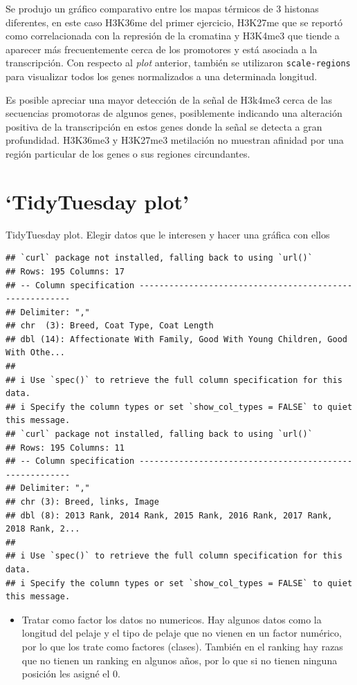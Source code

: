 \documentclass[
]{article}
\newcommand{\passthrough}[1]{#1}
\providecommand{\tightlist}{%
  \setlength{\itemsep}{0pt}\setlength{\parskip}{0pt}}
\begin{document}
Se produjo un gráfico comparativo entre los mapas térmicos de 3 histonas
diferentes, en este caso H3K36me del primer ejercicio, H3K27me que se
reportó como correlacionada con la represión de la cromatina y H3K4me3
que tiende a aparecer más frecuentemente cerca de los promotores y está
asociada a la transcripción. Con respecto al \emph{plot} anterior,
también se utilizaron \passthrough{\lstinline!scale-regions!} para
visualizar todos los genes normalizados a una determinada longitud.

Es posible apreciar una mayor detección de la señal de H3k4me3 cerca de
las secuencias promotoras de algunos genes, posiblemente indicando una
alteración positiva de la transcripción en estos genes donde la señal se
detecta a gran profundidad. H3K36me3 y H3K27me3 metilación no muestran
afinidad por una región particular de los genes o sus regiones
circundantes.

\hypertarget{tidytuesday-plot}{%
\section{`TidyTuesday plot'}\label{tidytuesday-plot}}

TidyTuesday plot. Elegir datos que le interesen y hacer una gráfica con
ellos

\begin{lstlisting}
## `curl` package not installed, falling back to using `url()`
## Rows: 195 Columns: 17
## -- Column specification --------------------------------------------------------
## Delimiter: ","
## chr  (3): Breed, Coat Type, Coat Length
## dbl (14): Affectionate With Family, Good With Young Children, Good With Othe...
## 
## i Use `spec()` to retrieve the full column specification for this data.
## i Specify the column types or set `show_col_types = FALSE` to quiet this message.
## `curl` package not installed, falling back to using `url()`
## Rows: 195 Columns: 11
## -- Column specification --------------------------------------------------------
## Delimiter: ","
## chr (3): Breed, links, Image
## dbl (8): 2013 Rank, 2014 Rank, 2015 Rank, 2016 Rank, 2017 Rank, 2018 Rank, 2...
## 
## i Use `spec()` to retrieve the full column specification for this data.
## i Specify the column types or set `show_col_types = FALSE` to quiet this message.
\end{lstlisting}

\begin{itemize}
\tightlist
\item
  Tratar como factor los datos no numericos. Hay algunos datos como la
  longitud del pelaje y el tipo de pelaje que no vienen en un factor
  numérico, por lo que los trate como factores (clases). También en el
  ranking hay razas que no tienen un ranking en algunos años, por lo que
  si no tienen ninguna posición les asigné el 0.
\end{itemize}
\end{document}
